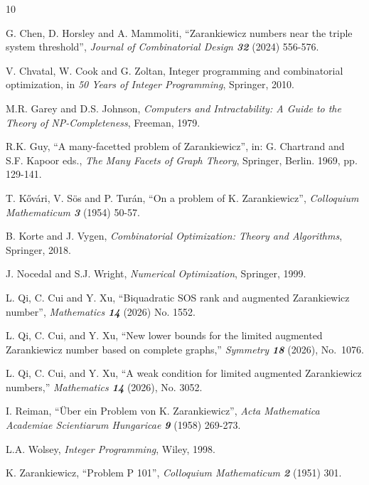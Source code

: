 \documentclass[10pt]{article}
\newcommand{\0}{\mathbf{0}}
\newcommand{\1}{\mathbf{1}}
\begin{document}
\begin{thebibliography}{10}

 G. Chen, D. Horsley and A. Mammoliti, ``Zarankiewicz numbers near the triple system threshold'', {\sl Journal of Combinatorial Design \bf 32} (2024) 556-576.

 V. Chvatal, W. Cook and G. Zoltan, Integer programming and combinatorial optimization, in {\sl 50 Years of Integer Programming}, Springer, 2010.

 M.R. Garey and D.S. Johnson, {\sl Computers and Intractability: A Guide to the Theory of NP-Completeness}, Freeman, 1979.

 R.K. Guy, ``A many-facetted problem of Zarankiewicz'', in: G. Chartrand and S.F. Kapoor eds., {\sl The Many Facets of Graph Theory}, Springer, Berlin. 1969, pp. 129-141.

 T. K\H{o}v\'{a}ri, V. S\"{o}s and P. Tur\'{a}n, ``On a problem of K. Zarankiewicz'', {\sl Colloquium Mathematicum \bf 3} (1954) 50-57.

 B. Korte and J. Vygen, {\sl Combinatorial Optimization: Theory and Algorithms}, Springer, 2018.

 J. Nocedal and S.J. Wright, {\sl Numerical Optimization}, Springer, 1999.


 L. Qi, C. Cui and Y. Xu, ``Biquadratic SOS rank and augmented Zarankiewicz number'', {\sl Mathematics \bf 14} (2026) No. 1552.

 L. Qi, C. Cui, and Y. Xu, ``New lower bounds for the limited augmented Zarankiewicz number based on complete graphs,'' {\sl Symmetry \bf 18} (2026), No.~1076.

 L. Qi, C. Cui, and Y. Xu, ``A weak condition for limited augmented Zarankiewicz numbers,'' {\sl Mathematics \bf 14} (2026), No. 3052.

 I. Reiman, ``\"{U}ber ein Problem von K. Zarankiewicz'', {\sl Acta Mathematica Academiae Scientiarum Hungaricae \bf 9} (1958) 269-273.

 L.A. Wolsey, {\sl Integer Programming}, Wiley, 1998.


 K. Zarankiewicz, ``Problem P 101'', {\sl Colloquium Mathematicum \bf 2} (1951) 301.

\end{thebibliography}
	
	
	
\end{document}
